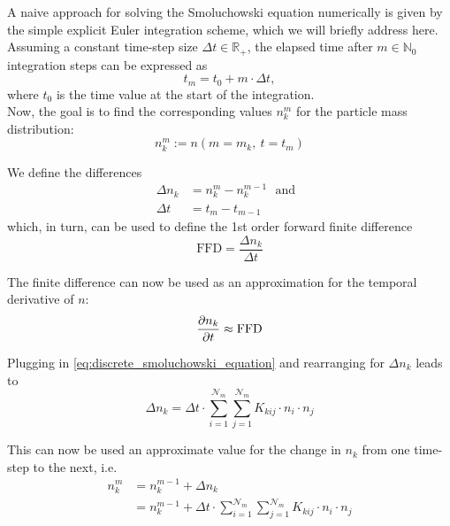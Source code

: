         A naive approach for solving the Smoluchowski equation numerically is given by the simple 
        explicit Euler integration scheme, which we will briefly address here. Assuming a constant 
        time-step size $\Delta t\in\mathbb R_+$, the elapsed time after $m\in\mathbb N_0$ integration 
        steps can be expressed as 
        \begin{equation}
            t_m
                =t_0+m\cdot\Delta t,
        \end{equation}
        where $t_0$ is the time value at the start of the integration.\\
        
        Now, the goal is to find the corresponding values $n_k^m$ for the particle mass 
        distribution:
        \begin{equation}
            n_k^m
                :=n(m=m_k,\ t=t_m)
        \end{equation}
        
        We define the differences
        \begin{align}
            \Delta n_k
                &=n_k^m-n_k^{m-1}
            \ \ \ \text{and}\ \ \
            \\
            \Delta t
                &=t_m-t_{m-1}
        \end{align}
        which, in turn, can be used to define the 1st order forward finite difference
        \begin{equation}
            \text{FFD}
                =\frac{\Delta n_k}{\Delta t}
        \end{equation}
        
        The finite difference can now be used as an approximation for the temporal derivative 
        of $n$:
        \begin{equation}
            \frac{\partial n_k}{\partial t}
                \approx\text{FFD}
        \end{equation}
        
        Plugging in \cref{eq:discrete_smoluchowski_equation} and rearranging for $\Delta n_k$ 
        leads to
        \begin{equation}
            \Delta n_k
            =\Delta t\cdot
                \sum_{i=1}^{\mathcal N_m}\sum_{j=1}^{\mathcal N_m}
                K_{kij}\cdot n_i\cdot n_j
        \end{equation}
        
        This can now be used an approximate value for the change in $n_k$ from one time-step to 
        the next, i.e.
        \begin{equation}
            \begin{split}
                n_k^m
                    &=n_k^{m-1}+\Delta n_k
                \\
                    &=n_k^{m-1}+\Delta t\cdot
                        \sum_{i=1}^{\mathcal N_m}\sum_{j=1}^{\mathcal N_m}
                        K_{kij}\cdot n_i\cdot n_j
            \end{split}
        \end{equation}
        
